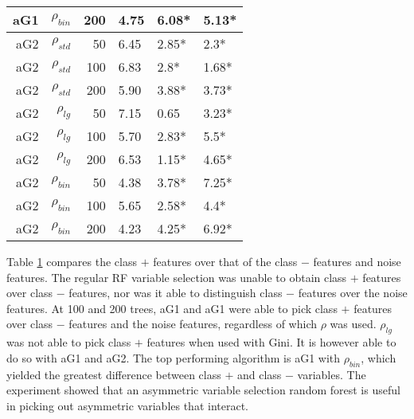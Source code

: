 \documentclass[twoside,11pt]{article}
\begin{document}
\begin{table}
\begin{tabular}{rrrp{2.5cm}p{2.5cm}p{2.5cm}}
aG1   & $\rho_{bin}$ & 200   & 4.75  & 6.08* & 5.13* \bigstrut[b]\\
\hline
aG2   & $\rho_{std}$ & 50    & 6.45  & 2.85* & 2.3* \bigstrut[t]\\
aG2   & $\rho_{std}$ & 100   & 6.83  & 2.8*  & 1.68* \\
aG2   & $\rho_{std}$ & 200   & 5.90  & 3.88* & 3.73* \bigstrut[b]\\
\hline
aG2   & $\rho_{lg}$ & 50    & 7.15  & 0.65  & 3.23* \bigstrut[t]\\
aG2   & $\rho_{lg}$ & 100   & 5.70  & 2.83* & 5.5* \\
aG2   & $\rho_{lg}$ & 200   & 6.53  & 1.15* & 4.65* \bigstrut[b]\\
\hline
aG2   & $\rho_{bin}$ & 50    & 4.38  & 3.78* & 7.25* \bigstrut[t]\\
aG2   & $\rho_{bin}$ & 100   & 5.65  & 2.58* & 4.4* \\
aG2   & $\rho_{bin}$ & 200   & 4.23  & 4.25* & 6.92* \bigstrut[b]\\
\hline
\end{tabular}%

\label{tab:asymmetricfeaturesresults2}%
\end{table}%

Table \ref{tab:asymmetricfeaturesresults2} compares the class $+$ features over that of the class $-$ features and noise features. The regular RF variable selection was unable to obtain class $+$ features over class $-$ features, nor was it able to distinguish class $-$ features over the noise features. At 100 and 200 trees, aG1 and aG1 were able to pick class $+$ features over class $-$ features and the noise features, regardless of which $\rho$ was used. $\rho_{lg}$ was not able to pick class $+$ features when used with Gini. It is however able to do so with aG1 and aG2. The top performing algorithm is aG1 with  $\rho_{bin}$, which yielded the greatest difference between class $+$ and class $-$ variables. The experiment showed that an asymmetric variable selection random forest is useful in picking out asymmetric variables that interact. 
\end{document}
